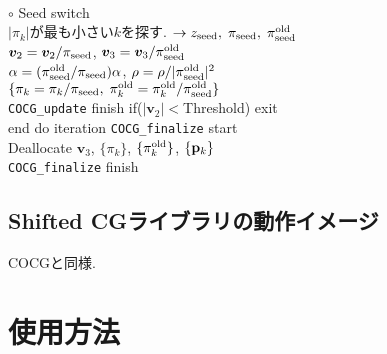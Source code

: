 \documentclass[12pt,titlepage]{jarticle}
\renewenvironment{leftbar}{%
  \def\FrameCommand{\vrule width 1pt \hspace{0pt}}%
  \MakeFramed {\advance\hsize-\width \FrameRestore}}%
 {\endMakeFramed}
\begin{document}
\begin{leftbar}
  \\\hspace{1.0cm}
  $\circ$ Seed switch
  \\\hspace{1.0cm}
  $|\pi_k|$が最も小さい$k$を探す. 
  $\rightarrow z_{\rm seed},\; \pi_{\rm seed},\; \pi_{\rm seed}^{\rm old} $
  \\\hspace{1.0cm}
  ${\boldsymbol v}_2 = {\boldsymbol v}_2 / \pi_{\rm seed}$,
  ${\boldsymbol v}_3 = {\boldsymbol v}_3 / \pi_{\rm seed}^{\rm old}$
  \\\hspace{1.0cm}
  $\alpha = (\pi_{\rm seed}^{\rm old} / \pi_{\rm seed}) \alpha$,
  $\rho = \rho / |\pi_{\rm seed}^{\rm old}|^2$
  \\\hspace{1.0cm}
  $\{\pi_k = \pi_k / \pi_{\rm seed},\; \pi_k^{\rm old} = \pi_k^{\rm old} / \pi_{\rm seed}^{\rm old}\}$
  \\\hspace{0.5cm}
  \verb|COCG_update| finish
\end{leftbar}
\vspace{-1em}
\noindent
\hspace{0.5cm}
if($|{\boldsymbol v}_2| < $Threshold) exit
\\
end do iteration
\vspace{-1em}
\begin{leftbar}
  \noindent
  \verb|COCG_finalize| start
  \\ \hspace{0.5cm}
  Deallocate ${\boldsymbol v}_3$, $\{\pi_k\}$, $\{\pi_k^{\rm old}\}$, $\{{\bf p}_k\}$
  \\
  \verb|COCG_finalize| finish
\end{leftbar}
\vspace{-1em}

\subsection{Shifted CGライブラリの動作イメージ}

COCGと同様.

\section{使用方法}
\end{document}

